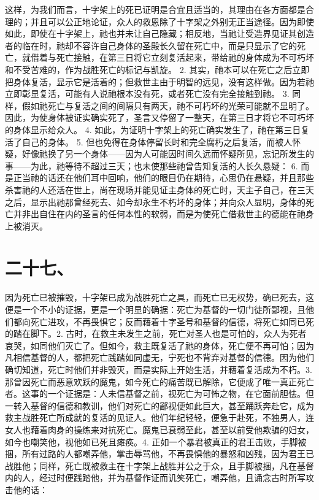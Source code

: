 这样，为我们而言，十字架上的死已证明是合宜且适当的，其理由在各方面都是合理的；并且可以公正地论证，众人的救恩除了十字架之外别无正当途径。因为即使如此，即使在十字架上，祂也并未让自己隐藏；相反地，当祂让受造界见证其创造者的临在时，祂却不容许自己身体的圣殿长久留在死亡中，而是只显示了它的死亡，就借着与死亡接触，在第三日将它立刻复活起来，带给祂的身体成为不可朽坏和不受苦难的，作为战胜死亡的标记与凯旋。 2. 其实，祂本可以在死亡之后立即把身体复活，显示它是活着的；但救世主由于明智的远见，没有这样做。因为若祂立即彰显复活，可能有人说祂根本没有死，或者死亡没有完全接触到祂。 3. 同样，假如祂死亡与复活之间的间隔只有两天，祂不可朽坏的光荣可能就不显明了。因此，为使身体被证实确实死了，圣言又停留了一整天，在第三日才将它不可朽坏的身体显示给众人。 4. 如此，为证明十字架上的死亡确实发生了，祂在第三日复活了自己的身体。 5. 但也免得在身体停留长时和完全腐朽之后复活，而被人怀疑，好像祂换了另一个身体——因为人可能因时间久远而怀疑所见，忘记所发生的事——为此，祂等待不超过三天；也未使那些祂曾告知复活的人长久悬疑： 6. 而是正当祂的话还在他们耳中回响，他们的眼目仍在期待，心思仍在悬疑，并且那些杀害祂的人还活在世上，尚在现场并能见证主身体的死亡时，天主子自己，在三天之后，显示出祂那曾经死去、如今却永生不朽坏的身体；并向众人显明，身体的死亡并非出自住在内的圣言的任何本性的软弱，而是为使死亡借救世主的德能在祂身上被消灭。\par


\section{二十七、}

因为死亡已被摧毁，十字架已成为战胜死亡之具，而死亡已无权势，确已死去，这便是一个不小的证据，更是一个明显的确据：死亡为基督的一切门徒所鄙视，且他们都向死亡进攻，不再畏惧它；反而藉着十字圣号和基督的信德，将死亡如同已死的踏在脚下。2. 古时，在救主未发生之前，死亡对圣人也是可怕的，众人为死者哀哭，如同他们灭亡了。但如今，救主既复活了祂的身体，死亡便不再可怕；因为凡相信基督的人，都把死亡践踏如同虚无，宁死也不背弃对基督的信德。因为他们确切知道，死亡时他们并非毁灭，而是实际上开始生活，并藉着复活成为不朽。3. 那曾因死亡而恶意欢跃的魔鬼，如今死亡的痛苦既已解除，它便成了唯一真正死亡者。这事的一个证据是：人未信基督之前，视死亡为可怖之物，在它面前胆怯。但一转入基督的信德和教训，他们对死亡的鄙视便如此巨大，甚至踊跃奔赴它，成为救主战胜死亡所成就的复活的见证人。他们年纪轻轻，便急于赴死，不独男人，连女人也藉着肉身的操练来对抗死亡。魔鬼已衰弱至此，甚至以前受他欺骗的妇女，如今也嘲笑他，视他如已死且瘫痪。4. 正如一个暴君被真正的君王击败，手脚被捆，所有过路的人都嘲弄他，掌击辱骂他，不再畏惧他的暴怒和凶残，因为君王已战胜他；同样，死亡既被救主在十字架上战胜并公之于众，且手脚被捆，凡在基督内的人，经过时便践踏他，并为基督作证而讥笑死亡，嘲弄他，且诵念古时所写攻击他的话：\par

